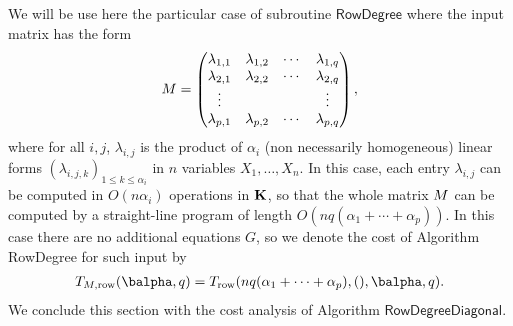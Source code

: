 \documentclass[12pt]{article}
\begin{document}
We will be use here the particular case of subroutine
$\mathsf{RowDegree}$ where the input matrix has the form
\begin{align}\label{eqdef:type2aff}
  {M}= \left( \begin{matrix}
    \lambda_{1,1} & \lambda_{1,2} & \cdots & \lambda_{1, q}\\
    \lambda_{2,1} &  \lambda_{2,2} & \cdots & \lambda_{2, q}\\
    \vdots & & & \vdots\\
    \lambda_{p,1} &  \lambda_{p,2}& \cdots & \lambda_{p, q}
  \end{matrix} \right),
\end{align}
where for all $i,j$, $\lambda_{i,j}$ is the product of $\alpha_i$ (non
necessarily homogeneous) linear forms $(\lambda_{i,j,k})_{1 \le k \le
  \alpha_i}$ in $n$ variables $X_1,\dots,X_n$. In this case, each
entry $\lambda_{i,j}$ can be computed in $O(n \alpha_i)$ operations in
$\mathbf{K}$, so that the whole matrix ${M}$ can be computed by a
straight-line program of length $O(nq(\alpha_1+\cdots+\alpha_p))$. In
this case there are no additional equations $G$, so we denote the cost
of Algorithm {\sf RowDegree} for such input by
\begin{align}
T_{M,{\rm row}}(\balpha,q)=T_{\rm row}(nq(\alpha_1+\cdots+\alpha_p),(),\balpha,q).
\end{align}
We conclude this section with the cost 
analysis of Algorithm $\mathsf{RowDegreeDiagonal}$.
\end{document}
